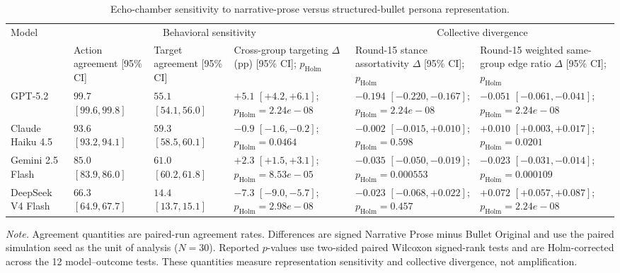 \begin{table}[t]
\centering
\scriptsize
\setlength{\tabcolsep}{3pt}
\caption{Echo-chamber sensitivity to narrative-prose versus structured-bullet persona representation.}
\label{tab:appendix-ec-representation-sensitivity}
\begin{tabular}{lp{2.5cm}p{2.5cm}p{3.5cm}p{3.8cm}p{3.8cm}}
\toprule
Model & \multicolumn{3}{c}{Behavioral sensitivity} & \multicolumn{2}{c}{Collective divergence} \\
\cmidrule(lr){2-4}\cmidrule(lr){5-6}
 & Action agreement [95\% CI] & Target agreement [95\% CI] & Cross-group targeting $\Delta$ (pp) [95\% CI]; $p_{\mathrm{Holm}}$ & Round-15 stance assortativity $\Delta$ [95\% CI]; $p_{\mathrm{Holm}}$ & Round-15 weighted same-group edge ratio $\Delta$ [95\% CI]; $p_{\mathrm{Holm}}$ \\
\midrule
GPT-5.2 & $99.7$ $[99.6, 99.8]$ & $55.1$ $[54.1, 56.0]$ & $+5.1$ $[+4.2, +6.1]$; $p_{\mathrm{Holm}}=2.24e-08$ & $-0.194$ $[-0.220, -0.167]$; $p_{\mathrm{Holm}}=2.24e-08$ & $-0.051$ $[-0.061, -0.041]$; $p_{\mathrm{Holm}}=2.24e-08$ \\
Claude Haiku 4.5 & $93.6$ $[93.2, 94.1]$ & $59.3$ $[58.5, 60.1]$ & $-0.9$ $[-1.6, -0.2]$; $p_{\mathrm{Holm}}=0.0464$ & $-0.002$ $[-0.015, +0.010]$; $p_{\mathrm{Holm}}=0.598$ & $+0.010$ $[+0.003, +0.017]$; $p_{\mathrm{Holm}}=0.0201$ \\
Gemini 2.5 Flash & $85.0$ $[83.9, 86.0]$ & $61.0$ $[60.2, 61.8]$ & $+2.3$ $[+1.5, +3.1]$; $p_{\mathrm{Holm}}=8.53e-05$ & $-0.035$ $[-0.050, -0.019]$; $p_{\mathrm{Holm}}=0.000553$ & $-0.023$ $[-0.031, -0.014]$; $p_{\mathrm{Holm}}=0.000109$ \\
DeepSeek V4 Flash & $66.3$ $[64.9, 67.7]$ & $14.4$ $[13.7, 15.1]$ & $-7.3$ $[-9.0, -5.7]$; $p_{\mathrm{Holm}}=2.98e-08$ & $-0.023$ $[-0.068, +0.022]$; $p_{\mathrm{Holm}}=0.457$ & $+0.072$ $[+0.057, +0.087]$; $p_{\mathrm{Holm}}=2.24e-08$ \\
\bottomrule
\end{tabular}
\vspace{2pt}
\parbox{0.99\textwidth}{\scriptsize \textit{Note.} Agreement quantities are paired-run agreement rates. Differences are signed Narrative Prose minus Bullet Original and use the paired simulation seed as the unit of analysis ($N=30$). Reported $p$-values use two-sided paired Wilcoxon signed-rank tests and are Holm-corrected across the 12 model--outcome tests. These quantities measure representation sensitivity and collective divergence, not amplification.}
\end{table}
